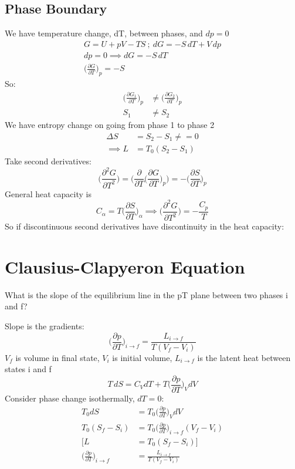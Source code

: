 \documentclass[a4paper, 11pt, normalem]{report}
\newcommand\p{\partial}
\begin{document}
\subsection{Phase Boundary}
We have temperature change, dT, between phases, and $dp = 0$
\begin{gather*}
    G = U + pV - TS ~;~ dG = -S\,dT + V\,dp \\
    dp = 0 \implies dG = -S\,dT \\
    \Big(\frac{\p G}{\p T}\Big)_p = -S
\end{gather*}
So:
\begin{align*}
    \Big(\frac{\p G_1}{\p T}\Big)_p &\neq \Big(\frac{\p G_2}{\p T}\Big)_p \\
    S_1 &\neq S_2
\end{align*}
We have entropy change on going from phase 1 to phase 2
\begin{align*}
    \Delta S &= S_2 - S_1 \neq = 0 \\
    \implies L &= T_0 (S_2 - S_1)
\end{align*}
Take second derivatives:
\begin{equation*}
    \Big(\frac{\p^2 G}{\p T^2}\Big) = \Bigg(\frac{\p}{\p T}\Big(\frac{\p G}{\p T}\Big)_p\Bigg) = -\Big(\frac{\p S}{\p T}\Big)_p
\end{equation*}
General heat capacity is
\begin{equation*}
    C_\alpha = T\Big(\frac{\p S}{\p T}\Big)_\alpha \implies \Big(\frac{\p^2 G}{\p T^2}\Big) = -\frac{C_p}{T}
\end{equation*}
So if discontinuous second derivatives have discontinuity in the heat capacity:

\section{Clausius-Clapyeron Equation}
What is the slope of the equilibrium line in the pT plane between two phases i and f?

Slope is the gradients:
\begin{equation*}
    \Big(\frac{\p p}{\p T}\Big)_{i \to f} = \frac{L_{i \to f}}{T(V_f - V_i)}
\end{equation*}
$V_f$ is volume in final state, $V_i$ is initial volume, $L_{i \to f}$ is the latent heat between states i and f
\begin{equation*}
    T\,dS = C_V dT + T\Big(\frac{\p p}{\p T}\Big)_V dV
\end{equation*}
Consider phase change isothermally, $dT = 0$:
\begin{align*}
    T_0 dS &= T_0 \Big(\frac{\p p}{\p T}\Big)_V dV \\
    T_0 (S_f - S_i) &= T_0 \Big(\frac{\p p}{\p T}\Big)_{i \to f} (V_f - V_i) \\
    [L &= T_0 (S_f - S_i)] \\
    \Big(\frac{\p p}{\p T}\Big)_{i \to f} &= \frac{L_{i \to f}}{T(V_f - V_i)}
\end{align*}
\end{document}
